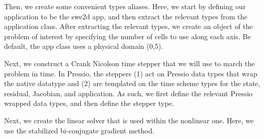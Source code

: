 Then, we create some convenient types aliases. Here, we start by defining our application to be the swe2d app, and then extract the relevant types from the application class. After extracting the relevant types, we create an object of the problem of interest by specifying the number of cells to use along each axis. Be default, the app class uses a physical domain (0,5). 
\begin{DoxyCode}{0}
\DoxyCodeLine{}
\DoxyCodeLine{\textcolor{comment}{// create FOM object/problem: contains grid, how to compute operators, etc}}

\end{DoxyCode}


Next, we construct a Crank Nicolson time stepper that we will use to march the problem in time. In Pressio, the steppers (1) act on Pressio data types that wrap the native datatype and (2) are templated on the time scheme types for the state, residual, Jacobian, and application. As such, we first define the relevant Pressio wrapped data types, and then define the stepper type. 
\begin{DoxyCode}{0}
\DoxyCodeLine{}

\end{DoxyCode}


Next, we create the linear solver that is used within the nonlinear one. Here, we use the stabilized bi-\/conjugate gradient method. 
\begin{DoxyCode}{0}
\DoxyCodeLine{\textcolor{comment}{// linear solver}}

\end{DoxyCode}


